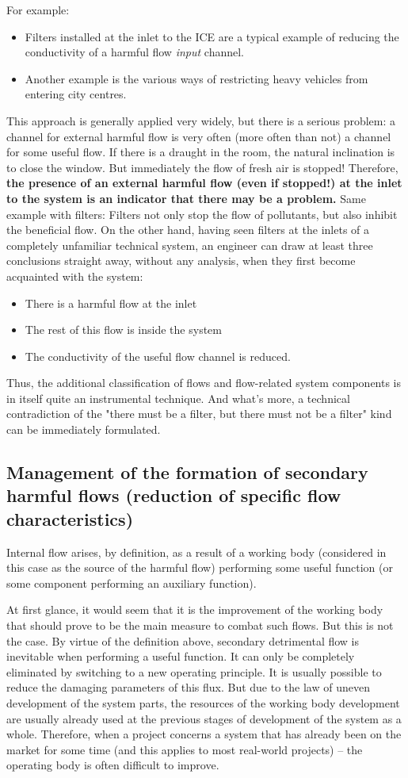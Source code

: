 \documentclass[a4paper,11pt]{article}
\begin{document}
For example:
\begin{itemize}
\item Filters installed at the inlet to the ICE are a typical example of
  reducing the conductivity of a harmful flow \emph{input} channel.
\item Another example is the various ways of restricting heavy vehicles from
  entering city centres.
\end{itemize}
This approach is generally applied very widely, but there is a serious
problem: a channel for external harmful flow is very often (more often than
not) a channel for some useful flow. If there is a draught in the room, the
natural inclination is to close the window. But immediately the flow of fresh
air is stopped! Therefore, \textbf{the presence of an external harmful flow
  (even if stopped!) at the inlet to the system is an indicator that there may
  be a problem.} Same example with filters: Filters not only stop the flow of
pollutants, but also inhibit the beneficial flow. On the other hand, having
seen filters at the inlets of a completely unfamiliar technical system, an
engineer can draw at least three conclusions straight away, without any
analysis, when they first become acquainted with the system:
\begin{itemize}
\item There is a harmful flow at the inlet
\item The rest of this flow is inside the system
\item The conductivity of the useful flow channel is reduced.
\end{itemize}
Thus, the additional classification of flows and flow-related system
components is in itself quite an instrumental technique. And what's more, a
technical contradiction of the "there must be a filter, but there must not be
a filter" kind can be immediately formulated.

\subsection{Management of the formation of secondary harmful flows (reduction
  of specific flow characteristics)} 

Internal flow arises, by definition, as a result of a working body (considered
in this case as the source of the harmful flow) performing some useful
function (or some component performing an auxiliary function).

At first glance, it would seem that it is the improvement of the working body
that should prove to be the main measure to combat such flows. But this is not
the case. By virtue of the definition above, secondary detrimental flow is
inevitable when performing a useful function. It can only be completely
eliminated by switching to a new operating principle. It is usually possible
to reduce the damaging parameters of this flux. But due to the law of uneven
development of the system parts, the resources of the working body development
are usually already used at the previous stages of development of the system
as a whole. Therefore, when a project concerns a system that has already been
on the market for some time (and this applies to most real-world projects) --
the operating body is often difficult to improve.
\end{document}
